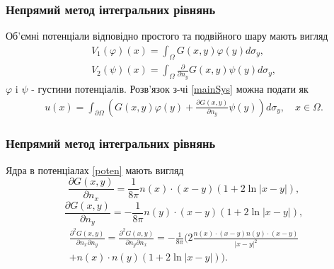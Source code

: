 \documentclass[10pt]{beamer}
\begin{document}
\begin{frame}
\frametitle{Непрямий метод інтегральних рівнянь}
Об'ємні потенціали відповідно простого та подвійного шару мають вигляд
\begin{equation}
\begin{split}
\label{poten}
	V_1(\varphi)(x)=\int_\Omega G(x,y)\varphi(y)d\sigma_y, \\
	V_2(\psi)(x)=\int_\Omega\frac{\partial}{\partial n_y}G(x,y)\psi(y) d\sigma_y,
\end{split}
\end{equation}
$\varphi$ i $\psi$ - густини потенціалів.
Розв'язок з-чі \eqref{mainSys} можна подати як
\begin{gather}
 \label{w}
 	 u(x)=\int_{\partial\Omega}(G(x,y)\varphi(y)+\frac{\partial G(x,y)}{\partial n_y}\psi(y))d\sigma_y, \quad x\in\Omega.
 \end{gather}

\end{frame}

\begin{frame}
\frametitle{Непрямий метод інтегральних рівнянь}
Ядра в потенціалах \eqref{poten} мають вигляд
 \begin{equation}
 	\frac{\partial G(x,y)}{\partial n_x}=\frac{1}{8\pi}n(x)\cdot(x-y)(1+2\ln|x-y|),
 \end{equation}
 \begin{equation}
 	\frac{\partial G(x,y)}{\partial n_y}=-\frac{1}{8\pi}n(y)\cdot(x-y)(1+2\ln|x-y|),
 \end{equation}
 \begin{gather}
 	\frac{\partial^2 G(x,y)}{\partial n_x\partial n_y}=\frac{\partial^2 G(x,y)}{\partial n_y\partial n_x}=-\frac{1}{8\pi}\bigg(2\frac{n(x)\cdot(x-y)n(y)\cdot(x-y)}{|x-y|^2} \\
	+n(x)\cdot n(y)(1+2\ln|x-y|)\bigg) \nonumber.
 \end{gather}
\end{frame}
\end{document}
